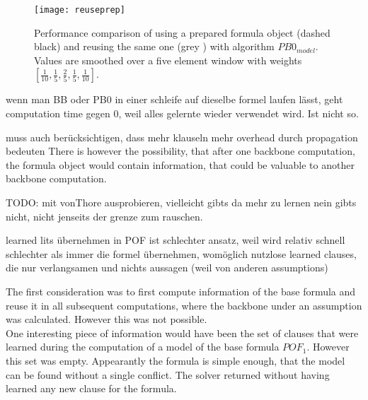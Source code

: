 \begin{figure}[h]
\centering
\texttt{[image: reuseprep]}
\caption[Performance comparison of using a prepared formula object and reusing the same one.]{Performance comparison of using a prepared formula object (dashed black) and reusing the same one (grey ) with algorithm $PB0_{model}$. Values are smoothed over a five element window with weights $[\frac{1}{10},\frac{1}{5},\frac{2}{5},\frac{1}{5},\frac{1}{10}]$.}
\label{fig:reusePrep}
\end{figure}



\iffalse



wenn man BB oder PB0 in einer schleife auf dieselbe formel laufen lässt, geht computation time gegen 0, weil alles gelernte wieder verwendet wird. Ist nicht so.

muss auch berücksichtigen, dass mehr klauseln mehr overhead durch propagation bedeuten
There is however the possibility, that after one backbone computation, the formula object would contain information, that could be valuable to another backbone computation.

TODO: mit vonThore ausprobieren, vielleicht gibts da mehr zu lernen nein gibts nicht, nicht jenseits der grenze zum rauschen.








learned lits übernehmen in POF ist schlechter ansatz, weil wird relativ schnell schlechter als immer die formel übernehmen, womöglich nutzlose learned clauses, die nur verlangsamen und nichts aussagen (weil von anderen assumptions)



The first consideration was to first compute information of the base formula and reuse it in all subsequent computations, where the backbone under an assumption was calculated. However this was not possible.\\
One interesting piece of information would have been the set of clauses that were learned during the computation of a model of the base formula $POF_1$. However this set was empty. Appearantly the formula is simple enough, that the model can be found without a single conflict. The solver returned without having learned any new clause for the formula.

